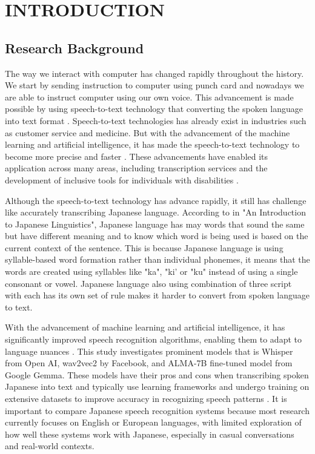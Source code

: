 \chapter{INTRODUCTION}
\label{ch:intro}

\section{Research Background}
\label{sec:intro-bg}

The way we interact with computer has changed rapidly throughout the history. We start by sending instruction to computer using punch card and nowadays we are able to instruct computer using our own voice. This advancement is made possible by using speech-to-text technology that converting the spoken language into text format \parencite{Xu}. Speech-to-text technologies has already exist in industries such as customer service and medicine. But with the advancement of the machine learning and artificial intelligence, it has made the speech-to-text technology to become more precise and faster \parencite{latif2020}. These advancements have enabled its application across many areas, including transcription services and the development of inclusive tools for individuals with disabilities \parencite{Koenecke2020}.

Although the speech-to-text technology has advance rapidly, it still has challenge like accurately transcribing Japanese language. According to \textcite{Kanno} in "An Introduction to Japanese Linguistics", Japanese language has may words that sound the same but have different meaning and to know which word is being used is based on the current context of the sentence. This is because Japanese language is using syllable-based word formation rather than individual phonemes, it means that the words are created using  syllables like "ka", "ki' or "ku" instead of using a single consonant or vowel. Japanese language also using combination of three script with each has its own set of rule makes it harder to convert from spoken language to text. 

With the advancement of machine learning and artificial intelligence, it has significantly improved speech recognition algorithms, enabling them to adapt to language nuances \parencite{xu2023recent}. This study investigates prominent models that is Whisper from Open AI, wav2vec2 by Facebook, and ALMA-7B fine-tuned model from Google Gemma. These models have their pros and cons when transcribing spoken Japanese into text and typically use learning frameworks and undergo training on extensive datasets to improve accuracy in recognizing speech patterns \parencite{ando2021}. It is important to compare Japanese speech recognition systems because most research currently focuses on English or European languages, with limited exploration of how well these systems work with Japanese, especially in casual conversations and real-world contexts.

